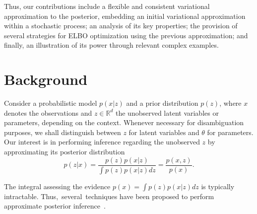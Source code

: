 
{ Thus, our contributions include a flexible and consistent variational approximation to the posterior,
embedding an initial variational approximation within a stochastic process;} %
an analysis of its key properties; %
    the provision of several strategies for ELBO
    optimization using the previous 
    approximation; and finally, 
    an illustration of its power through relevant complex examples.


 



\section{Background}
Consider a probabilistic model $p(x|z)$ and a prior distribution $p(z)$, where $x$ denotes the observations and $z \in \mathbb{R}^d$ the unobserved latent variables or parameters, depending on the context. Whenever necessary for disambiguation
purposes, we shall distinguish between $z$ for latent variables and $\theta$ for parameters. Our interest is in performing inference regarding the unobserved $z$ by approximating its posterior distribution
$$
p(z| x) = \frac{ p(z)p(x| z) }{ \int p(z)p(x| z) dz} = %
\frac{p(x, z)}{p(x)}.
$$

The integral assessing the evidence $p(x) = \int p(z)p(x| z) dz$ is typically intractable. %
Thus,~several~techniques have been proposed to perform approximate posterior inference~\cite{alquier2020approximate}.



